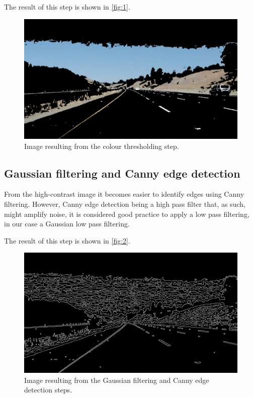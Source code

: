 \documentclass{article}
\begin{document}
The result of this step is shown in \autoref{fig:1}.
\begin{figure}
\centering
\includegraphics[scale=0.4]{lane_detection_steps/solidYellowCurve/1.jpg}
\caption{Image resulting from the colour thresholding step.}
\label{fig:1}
\end{figure}

\subsection{Gaussian filtering and Canny edge detection}
From the high-contrast image it becomes easier to identify edges using Canny filtering. However, Canny edge detection being a high pass filter that, as such, might amplify noise, it is considered good practice to apply a low pass filtering, in our case a Gaussian low pass filtering.

The result of this step is shown in \autoref{fig:2}.
\begin{figure}
\centering
\includegraphics[scale=0.4]{lane_detection_steps/solidYellowCurve/2.jpg}
\caption{Image resulting from the Gaussian filtering and Canny edge detection steps.}
\label{fig:2}
\end{figure}
\end{document}
